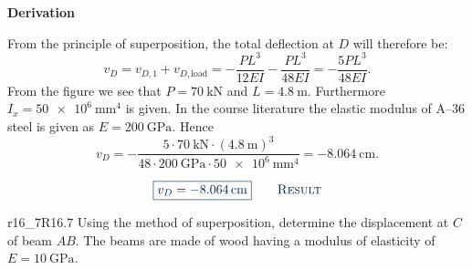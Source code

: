 \documentclass[a4paper]{article}
\newcounter{problem}
\numberwithin{equation}{problem}
\newcommand{\AUheading}[1]{%
  \par\vspace{.4\baselineskip}%
  {\sffamily\bfseries\color{AUblueDark}#1\par}%
  \nobreak%
}
\newenvironment{derivation}[1][Derivation]{%
  \AUheading{#1}
  \begingroup\allowdisplaybreaks
  \setlength{\abovedisplayskip}{6pt}%
  \setlength{\belowdisplayskip}{6pt}%
  \setlength{\abovedisplayshortskip}{4pt}%
  \setlength{\belowdisplayshortskip}{4pt}%
}{\par\endgroup\medskip}
\newcommand{\finalresult}[1]{%
  \vspace{.2\baselineskip}%
  \begin{equation}
    {\color{AUblueDark}\boxed{\displaystyle #1}}
    \tag*{\textsc{\textcolor{AUblueDark}{Result}}}
  \end{equation}
  \newpage
}
\begin{document}
\begin{derivation}
  From the principle of superposition, the total deflection at $D$ will therefore be:
  \begin{equation*}
    v_D = v_{D,1} + v_{D, \text{load}} = - \frac{PL^3}{12 EI} - \frac{PL^3}{48 EI} = - \frac{5 PL^3}{48EI}
  .\end{equation*}
  From the figure we see that $P = \qty{70}{\kN}$ and $L = \qty{4,8}{\m}$.
  Furthermore $I_x = \qty{50e6}{\mm^{4}}$ is given.
  In the course literature the elastic modulus of A--36 steel is given as $E = \qty{200}{\GPa}$.
  Hence
  \begin{equation*}
    v_D = - \frac{5 \cdot \qty{70}{\kN} \cdot \left( \qty{4,8}{\m}  \right)^3}{48 \cdot \qty{200}{\GPa} \cdot \qty{50e6}{\mm^{4}} } = \qty{-8,064}{\cm}
  .\end{equation*}
\end{derivation}

\finalresult{
  v_D = \qty{-8,064}{\cm} 
}

\begin{problemwithimage}{r16_7}{R16.7}
  Using the method of superposition, determine the displacement at $C$ of beam $AB$.
  The beams are made of wood having a modulus of elasticity of $E = \qty{10}{\GPa}$.
\end{problemwithimage}
\end{document}
